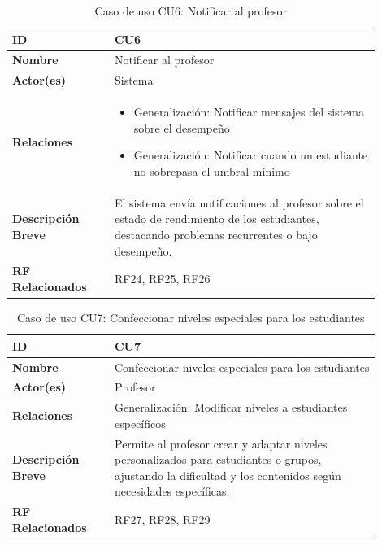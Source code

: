\begin{table}[H]
\centering
\begin{tabular}{|p{0.25\linewidth}|p{0.65\linewidth}|}
\hline
\textbf{ID} & CU6 \\
\hline
\textbf{Nombre} & Notificar al profesor \\
\hline
\textbf{Actor(es)} & Sistema \\
\hline
\textbf{Relaciones} & 
\begin{itemize}[leftmargin=*]
    \item Generalización: Notificar mensajes del sistema sobre el desempeño
    \item Generalización: Notificar cuando un estudiante no sobrepasa el umbral mínimo
\end{itemize} \\
\hline
\textbf{Descripción Breve} & El sistema envía notificaciones al profesor sobre el estado de rendimiento de los estudiantes, destacando problemas recurrentes o bajo desempeño. \\
\hline
\textbf{RF Relacionados} & RF24, RF25, RF26 \\
\hline
\end{tabular}
\caption{Caso de uso CU6: Notificar al profesor}
\end{table}

\begin{table}[H]
\centering
\begin{tabular}{|p{0.25\linewidth}|p{0.65\linewidth}|}
\hline
\textbf{ID} & CU7 \\
\hline
\textbf{Nombre} & Confeccionar niveles especiales para los estudiantes \\
\hline
\textbf{Actor(es)} & Profesor \\
\hline
\textbf{Relaciones} & Generalización: Modificar niveles a estudiantes específicos \\
\hline
\textbf{Descripción Breve} & Permite al profesor crear y adaptar niveles personalizados para estudiantes o grupos, ajustando la dificultad y los contenidos según necesidades específicas. \\
\hline
\textbf{RF Relacionados} & RF27, RF28, RF29 \\
\hline
\end{tabular}
\caption{Caso de uso CU7: Confeccionar niveles especiales para los estudiantes}
\end{table}


